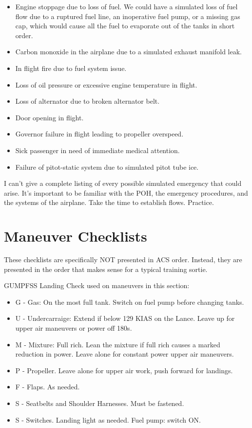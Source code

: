 \begin{itemize}
    \item Engine stoppage due to loss of fuel. We could have a simulated loss of fuel flow due to a ruptured fuel line, an inoperative fuel pump, or a missing gas cap, which would cause all the fuel to evaporate out of the tanks in short order.
    \item Carbon monoxide in the airplane due to a simulated exhaust manifold leak.
    \item In flight fire due to fuel system issue.
    \item Loss of oil pressure or excessive engine temperature in flight.
    \item Loss of alternator due to broken alternator belt.
    \item Door opening in flight.
    \item Governor failure in flight leading to propeller overspeed.
    \item Sick passenger in need of immediate medical attention.
    \item Failure of pitot-static system due to simulated pitot tube ice.
\end{itemize}

I can't give a complete listing of every possible simulated emergency that could arise. It's important to be familiar with the POH, the emergency procedures, and the systems of the airplane. Take the time to establish flows. Practice.

\section{Maneuver Checklists}

These checklists are specifically NOT presented in ACS order. Instead, they are presented in the order that makes sense for a typical training sortie.

GUMPFSS Landing Check used on maneuvers in this section:
\begin{itemize}
    \item G - Gas: On the most full tank. Switch on fuel pump before changing tanks.
    \item U - Undercarraige: Extend if below 129 KIAS on the Lance. Leave up for upper air maneuvers or power off 180s.
    \item M - Mixture: Full rich. Lean the mixture if full rich causes a marked reduction in power. Leave alone for constant power upper air maneuvers.
    \item P - Propeller. Leave alone for upper air work, push forward for landings.
    \item F - Flaps. As needed.
    \item S - Seatbelts and Shoulder Harnesses. Must be fastened.
    \item S - Switches. Landing light as needed. Fuel pump: switch ON.

\end{itemize}

